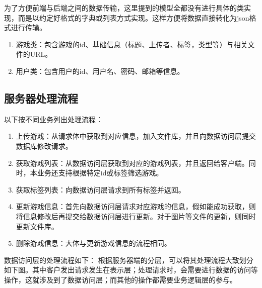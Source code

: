 \documentclass[12pt]{ctexart} %
\begin{document}
为了方便前端与后端之间的数据传输，这里提到的模型全都没有进行具体的类实现，而是以约定好格式的字典或列表方式实现。这样方便将数据直接转化为json格式进行传输。
\begin{enumerate}
  \item 游戏类：包含游戏的id、基础信息（标题、上传者、标签，类型等）与相关文件的URL。
  \item 用户类：包含用户的id、用户名、密码、邮箱等信息。
\end{enumerate}

\subsection{服务器处理流程}
以下按不同业务列出处理流程：
\begin{enumerate}
  \item 上传游戏：从请求体中获取到对应信息，加入文件库，并且向数据访问层提交数据库修改请求。
  \item 获取游戏列表：从数据访问层获取到对应的游戏列表，并且返回给客户端。同时，本业务还支持根据特定id或标签筛选游戏。
  \item 获取标签列表：向数据访问层请求到所有标签并返回。
  \item 更新游戏信息：首先向数据访问层请求对应游戏的信息，假如能成功获取，则将信息修改后再提交给数据访问层进行更新。对于图片等文件的更新，则同时更新文件库。
  \item 删除游戏信息：大体与更新游戏信息的流程相同。
\end{enumerate}
数据访问层的处理流程如下：
根据服务器端的分层，可以将其处理流程大致划分如下图。其中客户发出请求发生在表示层；处理请求时，会需要进行数据的访问等操作，这就涉及到了数据访问层；而其他的操作都需要业务逻辑层的参与。
\end{document}
